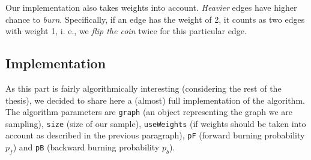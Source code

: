 Our implementation also takes weights into account. \emph{Heavier} edges have higher chance to \emph{burn}. Specifically, if an edge has the weight of 2, it counts as two edges with weight 1, i. e., we \emph{flip the coin} twice for this particular edge.

\subsection{Implementation}

As this part is fairly algorithmically interesting (considering the rest of the thesis), we decided to share here a (almost) full
implementation of the algorithm. The algorithm parameters are \texttt{graph} (an object representing the graph we are sampling), \texttt{size} (size of our sample), \texttt{useWeights} (if weights should be taken into account as described in the previous paragraph), \texttt{pF} (forward burning probability $p_f$) and \texttt{pB} (backward burning probability $p_b$).

